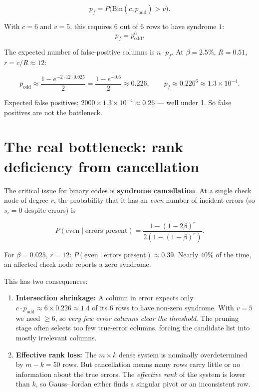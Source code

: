 \documentclass[11pt]{article}
\begin{document}
\[
p_f = P\bigl(\mathrm{Bin}(c, p_\text{odd}) > v\bigr) .
\]

With $c=6$ and $v=5$, this requires $6$ out of $6$ rows to have syndrome $1$:
\[
p_f = p_\text{odd}^6 .
\]

The expected number of false-positive columns is $n\cdot p_f$.
At $\beta=2.5\%$, $R=0.51$, $r=c/R\approx 12$:

\[
p_\text{odd} \approx \frac{1-e^{-2\cdot12\cdot0.025}}{2}
           = \frac{1-e^{-0.6}}{2} \approx 0.226,
\qquad
p_f \approx 0.226^6 \approx 1.3\times10^{-4}.
\]

Expected false positives: $2000\times 1.3\times10^{-4} \approx 0.26$ —
well under 1.  So false positives are not the bottleneck.

\section{The real bottleneck: rank deficiency from cancellation}

The critical issue for binary codes is \textbf{syndrome cancellation}.
At a single check node of degree $r$, the probability that it has an
\emph{even} number of incident errors (so $s_i=0$ despite errors) is

\[
P(\text{even}\mid \text{errors present})
= \frac{1 - (1-2\beta)^r}{2(1-(1-\beta)^r)} .
\]

For $\beta=0.025$, $r=12$: $P(\text{even}\mid\text{errors present}) \approx 0.39$.
Nearly $40\%$ of the time, an affected check node reports a zero syndrome.

This has two consequences:

\begin{enumerate}
  \item \textbf{Intersection shrinkage:} A column in error expects only
        $c\cdot p_\text{odd} \approx 6 \times 0.226 \approx 1.4$ of its $6$
        rows to have non-zero syndrome.  With $v=5$ we need $\ge 6$, so
        \emph{very few error columns clear the threshold}.  The pruning
        stage often selects too few true-error columns, forcing the
        candidate list into mostly irrelevant columns.

  \item \textbf{Effective rank loss:} The $m\times k$ dense system is
        nominally overdetermined by $m-k = 50$ rows.  But cancellation
        means many rows carry little or no information about the true
        errors.  The \emph{effective rank} of the system is lower than
        $k$, so Gauss--Jordan either finds a singular pivot or an
        inconsistent row.
\end{enumerate}
\end{document}

